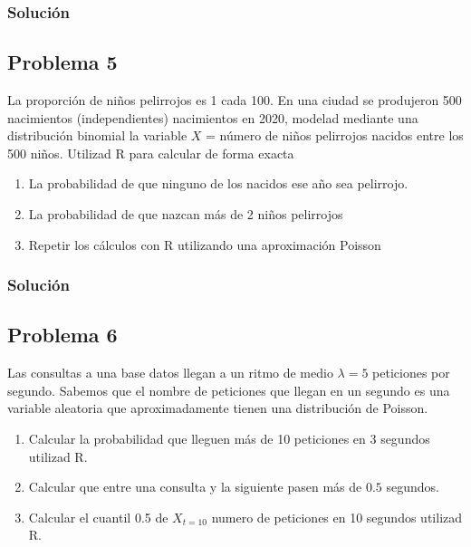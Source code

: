 \documentclass[
]{article}
\providecommand{\tightlist}{%
  \setlength{\itemsep}{0pt}\setlength{\parskip}{0pt}}
\begin{document}
\hypertarget{soluciuxf3n-3}{%
\subsubsection{Solución}\label{soluciuxf3n-3}}

\hypertarget{problema-5}{%
\subsection{Problema 5}\label{problema-5}}

La proporción de niños pelirrojos es 1 cada 100. En una ciudad se
produjeron 500 nacimientos (independientes) nacimientos en 2020, modelad
mediante una distribución binomial la variable \(X\) = número de niños
pelirrojos nacidos entre los 500 niños. Utilizad R para calcular de
forma exacta

\begin{enumerate}
\def\labelenumi{\arabic{enumi}.}
\tightlist
\item
  La probabilidad de que ninguno de los nacidos ese año sea pelirrojo.
\item
  La probabilidad de que nazcan más de 2 niños pelirrojos
\item
  Repetir los cálculos con R utilizando una aproximación Poisson
\end{enumerate}

\hypertarget{soluciuxf3n-4}{%
\subsubsection{Solución}\label{soluciuxf3n-4}}

\hypertarget{problema-6}{%
\subsection{Problema 6}\label{problema-6}}

Las consultas a una base datos llegan a un ritmo de medio \(\lambda=5\)
peticiones por segundo. Sabemos que el nombre de peticiones que llegan
en un segundo es una variable aleatoria que aproximadamente tienen una
distribución de Poisson.

\begin{enumerate}
\def\labelenumi{\arabic{enumi}.}
\tightlist
\item
  Calcular la probabilidad que lleguen más de 10 peticiones en 3
  segundos utilizad R.
\item
  Calcular que entre una consulta y la siguiente pasen más de \(0.5\)
  segundos.
\item
  Calcular el cuantil 0.5 de \(X_{t=10}\) numero de peticiones en 10
  segundos utilizad R.
\end{enumerate}
\end{document}
